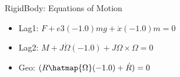 RigidBody: Equations of Motion
\begin{itemize}
\item Lag1: $F+e3 (-1.0) m g+\ddot{x} (-1.0) m = 0$
\item Lag2: $M+J \dot{\Omega } (-1.0)+J \Omega \times \Omega  = 0$
\item Geo: $(R \hatmap{\Omega } (-1.0)+\dot{R}) = 0$
\end{itemize}
